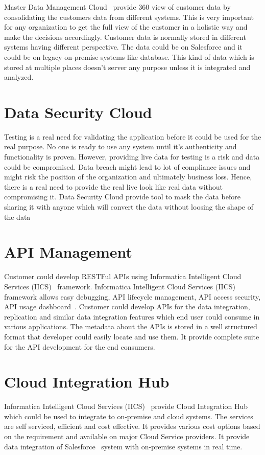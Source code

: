 Master Data Management Cloud~\cite{hid-sp18-511-iics} provide 360 view
of customer data by consolidating the customers data from different
systems. This is very important for any organization to get the full
view of the customer in a holistic way and make the decisions
accordingly. Customer data is normally stored in different systems
having different perspective. The data could be on
Salesforce\cite{hid-sp18-511-salesforce} and it could be on legacy
on-premise systems like database. This kind of data which is stored at
multiple places doesn't server any purpose unless it is integrated and
analyzed.

\section{Data Security Cloud}

Testing is a real need for validating the application before it could
be used for the real purpose. No one is ready to use any system until
it's authenticity and functionality is proven. However, providing live
data for testing is a risk and data could be compromised. Data breach
might lead to lot of compliance issues and might risk the position of
the organization and ultimately business loss. Hence, there is a real
need to provide the real live look like real data without compromising
it. Data Security Cloud\cite{hid-sp18-511-iics} provide tool to mask
the data before sharing it with anyone which will convert the data
without loosing the shape of the data

\section{API Management}

Customer could develop RESTFul APIs using Informatica Intelligent
Cloud Services (IICS)~\cite{hid-sp18-511-iics} framework. Informatica
Intelligent Cloud Services (IICS)~\cite{hid-sp18-511-iics} framework
allows easy debugging, API lifecycle management, API access security,
API usage dashboard~\cite{hid-sp18-511-iics-pricing}. Customer could
develop APIs for the data integration, replication and similar data
integration features which end user could consume in various
applications. The metadata about the APIs is stored in a well
structured format that developer could easily locate and use them. It
provide complete suite for the API development for the end consumers.

\section{Cloud Integration Hub}
Informatica Intelligent Cloud Services (IICS)~\cite{hid-sp18-511-iics}
provide Cloud Integration Hub~\cite{hid-sp18-511-iics-hub} which could
be used to integrate to on-premise and cloud systems. The services are
self serviced, efficient and cost effective. It provides various cost
options based on the requirement and available on major Cloud Service
providers. It provide data integration of
Salesforce~\cite{hid-sp18-511-salesforce} system with on-premise
systems in real time.

